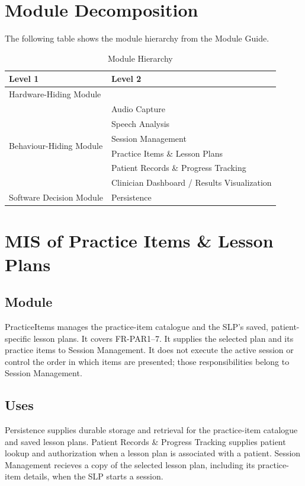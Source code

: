 \documentclass[12pt, titlepage]{article}
\begin{document}
\section{Module Decomposition}

The following table shows the module hierarchy from the Module Guide.

\begin{table}[h!]
\centering
\begin{tabular}{p{} p{}}
\toprule
\textbf{Level 1} & \textbf{Level 2}\\
\midrule
{Hardware-Hiding Module} & ~ \\
\midrule
\multirow{6}{0.3\textwidth}{Behaviour-Hiding Module} & Audio Capture\\
& Speech Analysis\\
& Session Management\\
& Practice Items \& Lesson Plans\\
& Patient Records \& Progress Tracking\\
& Clinician Dashboard / Results Visualization\\
\midrule
{Software Decision Module} & Persistence\\
\bottomrule
\end{tabular}
\caption{Module Hierarchy}
\label{TblMH}
\end{table}

\clearpage
\section{MIS of Practice Items \& Lesson Plans} \label{mis:practice}

\subsection{Module}
PracticeItems manages the practice-item catalogue and the SLP's saved,
patient-specific lesson plans. It covers FR-PAR1--7. It supplies the
selected plan and its practice items to Session Management. It does not
execute the active session or control the order in which items are presented;
those responsibilities belong to Session Management.

\subsection{Uses}
Persistence supplies durable storage and retrieval for the practice-item
catalogue and saved lesson plans. Patient Records \& Progress Tracking supplies patient lookup and authorization when a
lesson plan is associated with a patient. Session Management recieves a
copy of the selected lesson plan, including its practice-item details, when the SLP starts a session. 
\end{document}
